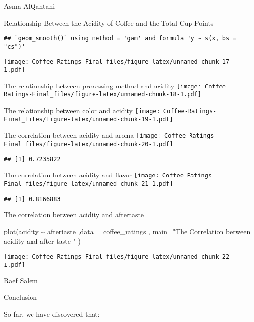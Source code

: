 \documentclass[
]{article}
\newenvironment{Shaded}{\begin{snugshade}}{\end{snugshade}}
\newcommand{\AttributeTok}[1]{\textcolor[rgb]{0.77,0.63,0.00}{#1}}
\newcommand{\FunctionTok}[1]{\textcolor[rgb]{0.00,0.00,0.00}{#1}}
\newcommand{\NormalTok}[1]{#1}
\newcommand{\SpecialCharTok}[1]{\textcolor[rgb]{0.00,0.00,0.00}{#1}}
\newcommand{\StringTok}[1]{\textcolor[rgb]{0.31,0.60,0.02}{#1}}
\begin{document}
Asma AlQahtani

Relationship Between the Acidity of Coffee and the Total Cup Points

\begin{verbatim}
## `geom_smooth()` using method = 'gam' and formula 'y ~ s(x, bs = "cs")'
\end{verbatim}

\texttt{[image: Coffee-Ratings-Final\_files/figure-latex/unnamed-chunk-17-1.pdf]}

The relationship between processing method and acidity
\texttt{[image: Coffee-Ratings-Final\_files/figure-latex/unnamed-chunk-18-1.pdf]}

The relationship between color and acidity
\texttt{[image: Coffee-Ratings-Final\_files/figure-latex/unnamed-chunk-19-1.pdf]}

The correlation between acidity and aroma
\texttt{[image: Coffee-Ratings-Final\_files/figure-latex/unnamed-chunk-20-1.pdf]}

\begin{verbatim}
## [1] 0.7235822
\end{verbatim}

The correlation between acidity and flavor
\texttt{[image: Coffee-Ratings-Final\_files/figure-latex/unnamed-chunk-21-1.pdf]}

\begin{verbatim}
## [1] 0.8166883
\end{verbatim}

The correlation between acidity and aftertaste

\begin{Shaded}
\begin{Highlighting}[]
\FunctionTok{plot}\NormalTok{(acidity }\SpecialCharTok{\textasciitilde{}}\NormalTok{ aftertaste ,}\AttributeTok{data =}\NormalTok{ coffee\_ratings , }\AttributeTok{main=}\StringTok{"The Correlation between acidity and after taste "}\NormalTok{  )}
\end{Highlighting}
\end{Shaded}

\texttt{[image: Coffee-Ratings-Final\_files/figure-latex/unnamed-chunk-22-1.pdf]}

Raef Salem

Conclusion

So far, we have discovered that:
\end{document}
